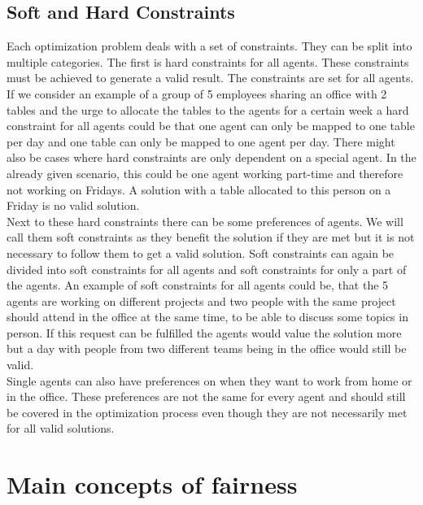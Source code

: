 \documentclass[german, a4paper, 11pt, oneside]{scrbook}
\begin{document}
\subsection{Soft and Hard Constraints}
Each optimization problem deals with a set of constraints. They can be split into multiple categories. The first is hard constraints for all agents. These constraints must be achieved to generate a valid result. The constraints are set for all agents. If we consider an example of a group of 5 employees sharing an office with 2 tables and the urge to allocate the tables to the agents for a certain week a hard constraint for all agents could be that one agent can only be mapped to one table per day and one table can only be mapped to one agent per day. There might also be cases where hard constraints are only dependent on a special agent. In the already given scenario, this could be one agent working part-time and therefore not working on Fridays. A solution with a table allocated to this person on a Friday is no valid solution. \\Next to these hard constraints there can be some preferences of agents. We will call them soft constraints as they benefit the solution if they are met but it is not necessary to follow them to get a valid solution. \cite{.2020} Soft constraints can again be divided into soft constraints for all agents and soft constraints for only a part of the agents. An example of soft constraints for all agents could be, that the 5 agents are working on different projects and two people with the same project should attend in the office at the same time, to be able to discuss some topics in person. If this request can be fulfilled the agents would value the solution more but a day with people from two different teams being in the office would still be valid. \\Single agents can also have preferences on when they want to work from home or in the office. These preferences are not the same for every agent and should still be covered in the optimization process even though they are not necessarily met for all valid solutions.


\section{Main concepts of fairness}
\end{document}
